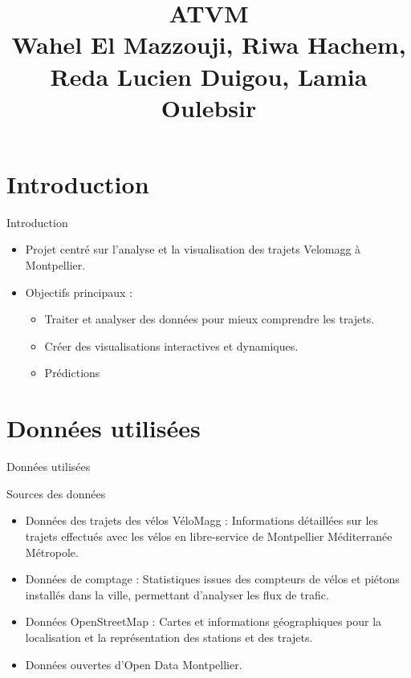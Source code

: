 \documentclass[10pt,svgnames,fragile]{beamer}
\institute[Université de Montpellier]{Master 1 SSD}
\author{} %
\date{}
\title{ATVM \\ 
\vspace{0.5cm}
\small Wahel El Mazzouji, Riwa Hachem, Reda Lucien Duigou, Lamia Oulebsir}
\begin{document}
\maketitle

\section{Introduction}
\label{sec:introduction}
\begin{frame}[label={sec:orge9abdcb}]{Introduction}
\begin{itemize}
    \item Projet centré sur l’analyse et la visualisation des trajets Velomagg à Montpellier.
    \item Objectifs principaux :
    \begin{itemize}
        \item Traiter et analyser des données pour mieux comprendre les trajets.
        \item Créer des visualisations interactives et dynamiques.
        \item Prédictions
    \end{itemize}
\end{itemize}
\end{frame}
\section{Données utilisées}
\label{sec:data}
\begin{frame}[label={sec:dataframe}]{Données utilisées}
\begin{block}{Sources des données}
\begin{itemize}
    \item Données des trajets des vélos VéloMagg : Informations détaillées sur les trajets effectués avec les vélos en libre-service de Montpellier Méditerranée Métropole.
    \item Données de comptage : Statistiques issues des compteurs de vélos et piétons installés dans la ville, permettant d'analyser les flux de trafic.
    \item Données OpenStreetMap : Cartes et informations géographiques pour la localisation et la représentation des stations et des trajets.
    \item Données ouvertes d'Open Data Montpellier.
\end{itemize}
\end{block}
\end{frame}
\end{document}
